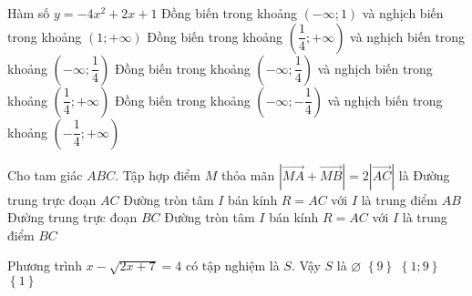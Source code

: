 \begin{ex}%
	Hàm số $y=-4x^2+2x+1$
	\choice
	{Đồng biến trong khoảng $\left( -\infty;1\right)$ và nghịch biến trong khoảng $\left( 1;+\infty\right)$}
	{Đồng biến trong khoảng $\left(\dfrac{1}{4} ;+\infty\right)$ và nghịch biến trong khoảng $\left( -\infty; \dfrac{1}{4}\right)$}
	{\True Đồng biến trong khoảng $\left( -\infty;\dfrac{1}{4}\right)$ và nghịch biến trong khoảng $\left( \dfrac{1}{4};+\infty\right)$}
	{Đồng biến trong khoảng $\left( -\infty;-\dfrac{1}{4}\right)$ và nghịch biến trong khoảng $\left( -\dfrac{1}{4};+\infty\right)$}
\end{ex}
\begin{ex}%
	Cho tam giác $ABC$. Tập hợp điểm $M$ thỏa mãn $ \left| \vec{MA}+\vec{MB}\right|=2\left| \vec{AC}\right|$ là
	\choice
	{Đường trung trực đoạn $AC$}
	{\True Đường tròn tâm $I$ bán kính $R=AC$ với $I$ là trung điểm $AB$}
	{Đường trung trực đoạn $BC$}
	{Đường tròn tâm $I$ bán kính $R=AC$ với $I$ là trung điểm $BC$ }
\end{ex}
\begin{ex}%
	Phương trình $x-\sqrt{2x+7}=4$ có tập nghiệm là $S$. Vậy $S$ là	
	\choice
	{$\varnothing$}
	{\True $\left\lbrace {9} \right\rbrace $}
	{$\left\lbrace {1;9} \right\rbrace $}
	{$\left\lbrace {1} \right\rbrace $}
\end{ex}

